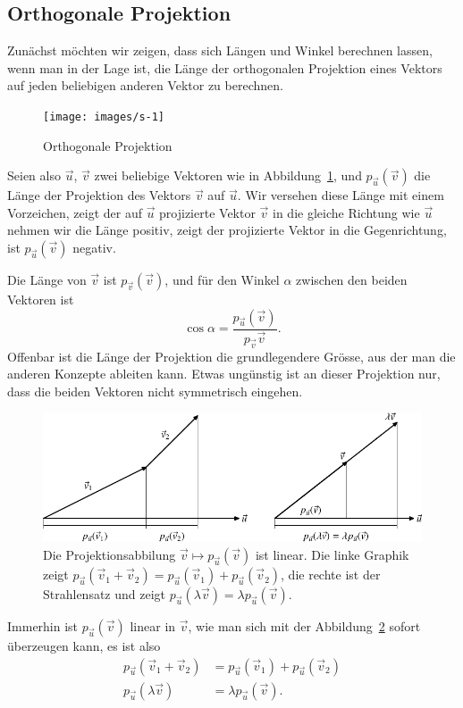 \subsection{Orthogonale Projektion}
Zunächst möchten wir zeigen, dass sich Längen und Winkel berechnen
lassen, wenn man in der Lage ist, die Länge der orthogonalen Projektion
eines Vektors auf jeden beliebigen anderen Vektor zu berechnen.
\begin{figure}
\begin{center}
\texttt{[image: images/s-1]}
\end{center}
\caption{Orthogonale Projektion\label{orthproj}}
\end{figure}

Seien also $\vec u$, $\vec v$ zwei beliebige Vektoren wie in Abbildung~\ref{orthproj}, und $p_{\vec u}(\vec v)$
die Länge der Projektion des Vektors $\vec v$ auf $\vec u$.
Wir versehen diese Länge mit einem Vorzeichen, zeigt der auf $\vec u$
projizierte Vektor $\vec v$ in die gleiche Richtung wie $\vec u$
nehmen wir die Länge positiv, zeigt der projizierte Vektor in die
Gegenrichtung, ist $p_{\vec u}(\vec v)$ negativ.

Die Länge von $\vec v$ ist $p_{\vec v}(\vec v)$, und für den Winkel
$\alpha$ zwischen den beiden Vektoren ist
\begin{equation}
\cos \alpha = \frac{p_{\vec u}(\vec v)}{p_{\vec v}{\vec v}}.
\label{zwischenwinkel}
\end{equation}
Offenbar ist die Länge der Projektion die grundlegendere Grösse,
aus der man die anderen Konzepte ableiten kann.
Etwas ungünstig ist an dieser Projektion nur, dass die beiden Vektoren nicht
symmetrisch eingehen.
\begin{figure}
\centering
\includegraphics{images/v-11.pdf}
\caption{Die Projektionsabbilung
$\vec{v}\mapsto p_{\vec{u}}(\vec{v})$
ist linear. Die linke Graphik zeigt
$p_{\vec{u}}(\vec{v}_1+\vec{v}_2)
=
p_{\vec{u}}(\vec{v}_1)+p_{\vec{u}}(\vec{v}_2)$,
die rechte ist der Strahlensatz und zeigt
$p_{\vec{u}}(\lambda\vec{v})=\lambda p_{\vec{u}}(\vec{v})$.
\label{projektionlinearitaet}}
\end{figure}
Immerhin ist $p_{\vec u}(\vec v)$ linear in $\vec v$, wie man
sich mit der Abbildung~\ref{projektionlinearitaet}
sofort überzeugen kann, es ist also
\begin{align*}
p_{\vec u}(\vec v_1+\vec v_2)&=p_{\vec u}(\vec v_1)+p_{\vec u}(\vec v_2)\\
p_{\vec u}(\lambda \vec v)&=\lambda p_{\vec u}(\vec v).
\end{align*}

